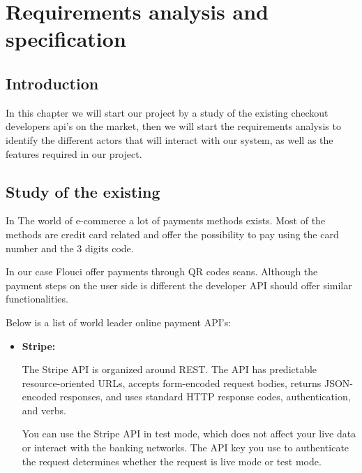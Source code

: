 
\setcounter{chapter}{1}
\chapter{Requirements analysis and specification}
\minitoc %
\graphicspath{{Chapter2/figures/}}


\pagestyle{fancy}
\fancyhf{}
\fancyhead[R]{\bfseries\rightmark}
\fancyfoot[R]{\thepage}
\renewcommand{\headrulewidth}{0.5pt}
\renewcommand{\footrulewidth}{0pt}
\renewcommand{\chaptermark}[1]{\markboth{\MakeUppercase{\chaptername~\thechapter. #1 }}{}}
\renewcommand{\sectionmark}[1]{\markright{\thechapter.\thesection~ #1}}

\begin{spacing}{1.2}
\section*{Introduction}
In this chapter we will start our project by a study of the existing checkout developers api's on the market, then we will start the requirements analysis to identify the different actors that will interact with our system, as well as the features required in our project.
\section{Study of the existing}
In The world of e-commerce a lot of payments methods exists. Most of the methods are credit card related and offer the possibility to pay using the card number and the 3 digits code.

In our case Flouci offer payments through QR codes scans. Although the payment steps on the user side is different the developer API should offer similar functionalities.


Below is a list of world leader online payment API's:
\begin{itemize}
  \item \textbf{Stripe:}

 The Stripe API is organized around REST. The API has predictable resource-oriented URLs, accepts form-encoded request bodies, returns JSON-encoded responses, and uses standard HTTP response codes, authentication, and verbs.

You can use the Stripe API in test mode, which does not affect your live data or interact with the banking networks. The API key you use to authenticate the request determines whether the request is live mode or test mode.


\end{itemize}
\end{spacing}
